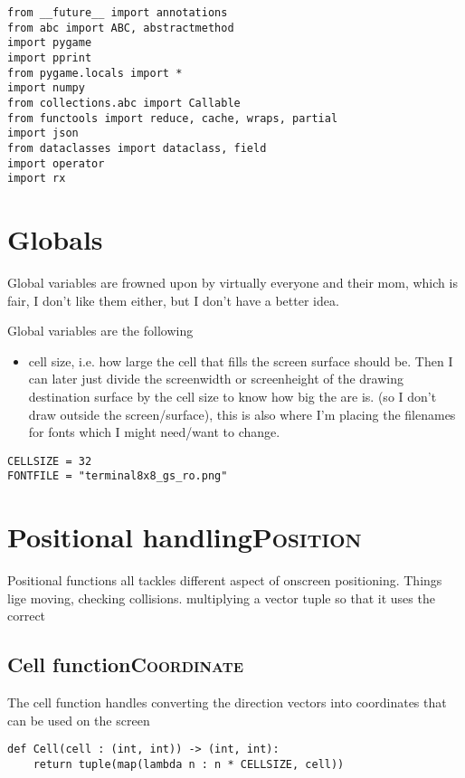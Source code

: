 \documentclass[11pt]{article}
\begin{document}
\begin{verbatim}
from __future__ import annotations
from abc import ABC, abstractmethod
import pygame
import pprint
from pygame.locals import *
import numpy
from collections.abc import Callable
from functools import reduce, cache, wraps, partial
import json
from dataclasses import dataclass, field
import operator
import rx
\end{verbatim}

\section{Globals}
\label{sec:org345a086}

Global variables are frowned upon by virtually everyone and their mom, which is fair, I don't like them either, but I don't have a better idea.

Global variables are the following
\begin{itemize}
\item cell size, i.e. how large the cell that fills the screen surface should be. Then I can later just divide the screenwidth or screenheight of the drawing destination surface by the cell size to know how big the are is. (so I don't draw outside the screen/surface), this is also where I'm placing the filenames for fonts which I might need/want to change.
\end{itemize}

\begin{verbatim}
CELLSIZE = 32
FONTFILE = "terminal8x8_gs_ro.png"
\end{verbatim}


\section{Positional handling\hfill{}\textsc{Position}}
\label{sec:org3ff2447}

Positional functions all tackles different aspect of onscreen positioning. Things lige moving, checking collisions. multiplying a vector tuple so that it uses the correct 

\subsection{Cell function\hfill{}\textsc{Coordinate}}
\label{sec:orge37d44c}

The cell function handles converting the direction vectors into coordinates that can be used on the screen

\begin{verbatim}
def Cell(cell : (int, int)) -> (int, int):
    return tuple(map(lambda n : n * CELLSIZE, cell))
\end{verbatim}
\end{document}
